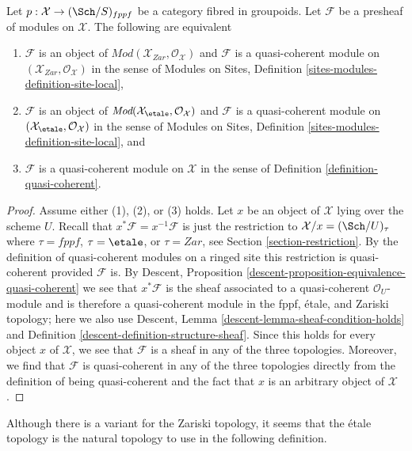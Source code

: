 \begin{lemma}
\label{lemma-characterize-quasi-coherent-bis}
Let $p : \mathcal{X} \to (\Sch/S)_{fppf}$ be a category
fibred in groupoids. Let $\mathcal{F}$ be a presheaf of
modules on $\mathcal{X}$. The following are equivalent
\begin{enumerate}
\item $\mathcal{F}$ is an object of
$\textit{Mod}(\mathcal{X}_{Zar}, \mathcal{O}_\mathcal{X})$
and $\mathcal{F}$ is a quasi-coherent module on
$(\mathcal{X}_{Zar}, \mathcal{O}_\mathcal{X})$ in the sense of
Modules on Sites, Definition \ref{sites-modules-definition-site-local},
\item $\mathcal{F}$ is an object of
$\textit{Mod}(\mathcal{X}_\etale, \mathcal{O}_\mathcal{X})$
and $\mathcal{F}$ is a quasi-coherent module on
$(\mathcal{X}_\etale, \mathcal{O}_\mathcal{X})$ in the sense of
Modules on Sites, Definition \ref{sites-modules-definition-site-local}, and
\item $\mathcal{F}$ is a quasi-coherent module on $\mathcal{X}$
in the sense of Definition \ref{definition-quasi-coherent}.
\end{enumerate}
\end{lemma}

\begin{proof}
Assume either (1), (2), or (3) holds.
Let $x$ be an object of $\mathcal{X}$ lying over the scheme $U$.
Recall that $x^*\mathcal{F} = x^{-1}\mathcal{F}$ is just the
restriction to $\mathcal{X}/x = (\Sch/U)_\tau$ where
$\tau = fppf$, $\tau = \etale$, or $\tau = Zar$, see
Section \ref{section-restriction}.
By the definition of quasi-coherent modules on a ringed site
this restriction is quasi-coherent provided $\mathcal{F}$ is.
By Descent, Proposition \ref{descent-proposition-equivalence-quasi-coherent}
we see that $x^*\mathcal{F}$ is the sheaf associated to
a quasi-coherent $\mathcal{O}_U$-module and is therefore
a quasi-coherent module in the fppf, \'etale, and Zariski
topology; here we also use
Descent, Lemma \ref{descent-lemma-sheaf-condition-holds} and
Definition \ref{descent-definition-structure-sheaf}.
Since this holds for every object $x$ of $\mathcal{X}$,
we see that $\mathcal{F}$ is a sheaf in any of the three topologies.
Moreover, we find that $\mathcal{F}$ is quasi-coherent in any
of the three topologies directly from the definition of being
quasi-coherent and the fact that $x$ is an arbitrary object of $\mathcal{X}$.
\end{proof}

\noindent
Although there is a variant for the Zariski topology, it seems
that the \'etale topology is the natural topology to use in the
following definition.

